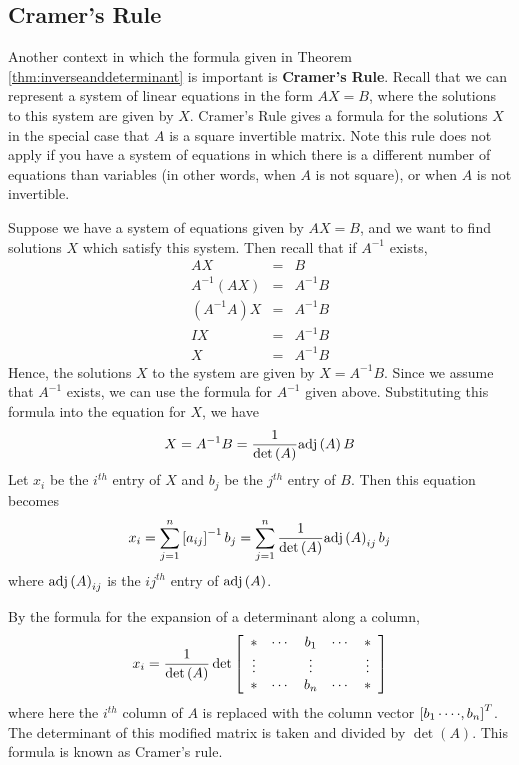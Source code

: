 \subsection{Cramer's Rule}

Another context in which the formula given in Theorem
\ref{thm:inverseanddeterminant} is important is \textbf{Cramer's
Rule}.  Recall that we can represent a system of linear equations in
the form $AX=B$, where the solutions to this system are given by $X$.
Cramer's Rule gives a formula for the solutions $X$ in the special
case that $A$ is a square invertible matrix. Note this rule does not
apply if you have a system of equations in which there is a different
number of equations than variables (in other words, when $A$ is not
square), or when $A$ is not invertible.

Suppose we have a system of equations given by $AX=B$, and we want to find solutions $X$ which satisfy 
this system.
Then recall that if $A^{-1}$ exists,
\begin{eqnarray*}
AX&=&B \\
A^{-1}\left(AX\right)&=&A^{-1}B \\
\left(A^{-1}A\right)X&=&A^{-1}B \\
IX&=&A^{-1}B\\
X &=& A^{-1}B
\end{eqnarray*}
Hence, the solutions $X$ to the system are given by $X=A^{-1}B$. 
Since we assume that $A^{-1}$ exists, we can use the
formula for $A^{-1}$ given above. Substituting this formula into the equation for $X$, we have 
\begin{equation*}
X=A^{-1}B=\frac{1}{\det \left( A\right) }\mbox{adj}\left( A\right)B
\end{equation*}
Let $x_i$ be the $i^{th}$ entry of $X$ and $b_j$ be the $j^{th}$ entry of $B$.
Then this equation becomes
\begin{equation*}
x_i = \sum_{j=1}^{n}\leftB a_{ij}\rightB^{-1}b_{j}=\sum_{j=1}^{n}\vspace{0.05in}\frac{1}
{\det \left( A\right) } \func{adj}\left( A\right) _{ij}b_{j}
\end{equation*}
where $\mbox{adj}\left(A\right)_{ij}$ is the $ij^{th}$ entry of $\mbox{adj}\left(A\right)$.

By the formula for the expansion of a determinant along a column,
\begin{equation*}
x_{i}=\vspace{0.05in}\frac{1}{\det \left( A\right) }\det \leftB
\begin{array}{ccccc}
\ast & \cdots & b_{1} & \cdots & \ast \\
\vdots &  & \vdots &  & \vdots \\
\ast & \cdots & b_{n} & \cdots & \ast
\end{array}
\rightB 
\end{equation*}
where here the $i^{th}$ column of $A$ is replaced with the column vector 
$\left[ b_{1}\cdots \cdot ,b_{n}\right] ^{T}$. The determinant of this
modified matrix is taken and divided by $\det \left( A\right) $. This
formula is known as Cramer's rule.

